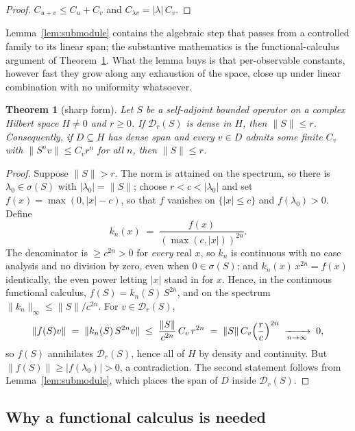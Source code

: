 \documentclass[11pt]{article}
\newtheorem{theorem}{Theorem}[section]
\theoremstyle{definition}
\begin{document}
\begin{proof}
$C_{u+v} \le C_u + C_v$ and $C_{\lambda v} = |\lambda|\,C_v$.
\end{proof}

Lemma~\ref{lem:submodule} contains the algebraic step that passes from a
controlled family to its linear span; the substantive mathematics is the
functional-calculus argument of Theorem~\ref{thm:sharp}.  What the lemma
buys is that
per-observable constants, however fast they grow along any exhaustion of
the space, close up under linear combination with no uniformity
whatsoever.

\begin{theorem}[sharp form]
\label{thm:sharp}
Let $S$ be a self-adjoint bounded operator on a complex Hilbert space
$H \neq 0$ and $r \ge 0$.  If $\mathcal{D}_r(S)$ is dense in $H$, then
$\|S\| \le r$.  Consequently, if $D \subseteq H$ has dense span and every
$v \in D$ admits some finite $C_v$ with $\|S^n v\| \le C_v r^n$ for all
$n$, then $\|S\| \le r$.
\end{theorem}

\begin{proof}
Suppose $\|S\| > r$.  The norm is attained on the spectrum, so there is
$\lambda_0 \in \sigma(S)$ with $|\lambda_0| = \|S\|$; choose
$r < c < |\lambda_0|$ and set $f(x) = \max(0, |x| - c)$, so that $f$
vanishes on $\{|x| \le c\}$ and $f(\lambda_0) > 0$.  Define
\[
  k_n(x) \;=\; \frac{f(x)}{(\max(c,|x|))^{2n}} .
\]
The denominator is $\ge c^{2n} > 0$ for \emph{every} real $x$, so $k_n$
is continuous with no case analysis and no division by zero, even when
$0 \in \sigma(S)$; and $k_n(x)\,x^{2n} = f(x)$ identically, the even
power letting $|x|$ stand in for $x$.  Hence, in the continuous
functional calculus, $f(S) = k_n(S)\,S^{2n}$, and on the spectrum
$\|k_n\|_\infty \le \|S\|/c^{2n}$.  For $v \in \mathcal{D}_r(S)$,
\[
  \|f(S)v\| \;=\; \|k_n(S)\,S^{2n}v\|
  \;\le\; \frac{\|S\|}{c^{2n}}\,C_v\,r^{2n}
  \;=\; \|S\|\,C_v \Bigl(\frac{r}{c}\Bigr)^{2n}
  \;\xrightarrow[n\to\infty]{}\; 0 ,
\]
so $f(S)$ annihilates $\mathcal{D}_r(S)$, hence all of $H$ by density and
continuity.  But $\|f(S)\| \ge |f(\lambda_0)| > 0$, a contradiction.  The
second statement follows from Lemma~\ref{lem:submodule}, which places the
span of $D$ inside $\mathcal{D}_r(S)$.
\end{proof}

\subsection*{Why a functional calculus is needed}
\label{rem:notelem}
\end{document}

